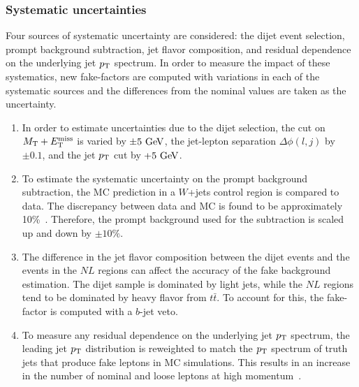 %
\subsubsection{Systematic uncertainties}\label{ssww13tev:ff_systematics}
Four sources of systematic uncertainty are considered: the dijet event selection, prompt background subtraction, jet flavor composition, and residual dependence on the underlying jet $p_{\mathrm{T}}$ spectrum.
In order to measure the impact of these systematics, new fake-factors are computed with variations in each of the systematic sources and the differences from the nominal values are taken as the uncertainty.
\begin{enumerate}
\item In order to estimate uncertainties due to the dijet selection, the cut on $M_{\textrm{T}}+E_{\mathrm{T}}^{\mathrm{miss}}$ is varied by $\pm5\gev$, the jet-lepton separation $\Delta\phi(l,j)$ by $\pm 0.1$, and the jet $p_{\mathrm{T}}$ cut by $+5\gev$.
\item To estimate the systematic uncertainty on the prompt background subtraction, the MC prediction in a $W$+jets control region is compared to data.  The discrepancy between data and MC is found to be approximately 10\%~\cite{2018.ssww-13tev-atlas-support}.  Therefore, the prompt background used for the subtraction is scaled up and down by $\pm 10\%$.
\item The difference in the jet flavor composition between the dijet events and the events in the $NL$ regions can affect the accuracy of the fake background estimation.  The dijet sample is dominated by light jets, while the $NL$ regions tend to be dominated by heavy flavor from $t\bar{t}$.  To account for this, the fake-factor is computed with a $b$-jet veto.
\item To measure any residual dependence on the underlying jet $p_{\mathrm{T}}$ spectrum, the leading jet $p_{\mathrm{T}}$ distribution is reweighted to match the $p_{\mathrm{T}}$ spectrum of truth jets that produce fake leptons in MC simulations.  This results in an increase in the number of nominal and loose leptons at high momentum~\cite{2018.ssww-13tev-atlas-support}.
\end{enumerate}

